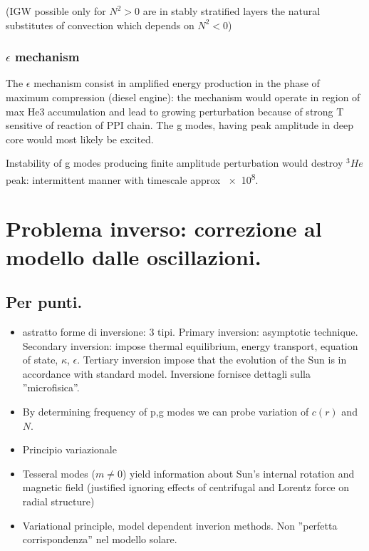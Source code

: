 \documentclass[oneside,12pt,fleqn]{memoir}
\begin{document}
{(IGW possible only for $N^2>0$ are in stably stratified layers the natural substitutes of convection which depends on $N^2<0$)

\subsection{$\epsilon$ mechanism}

The $\epsilon$ mechanism consist in amplified energy production in the phase of maximum compression (diesel engine): the mechanism would operate in region of max He3 accumulation and lead to growing perturbation because of strong T sensitive of  reaction of PPI chain. The g modes, having peak amplitude in deep core would most likely be excited.

Instability of g modes producing finite amplitude perturbation would destroy $^3He$ peak: intermittent manner with timescale approx \SI{e8}{\year}.


\chapter{Problema inverso: correzione al modello dalle oscillazioni.}
\PartialToc

\section{Per punti.}

\begin{itemize}
    
    \item astratto forme di inversione: 3 tipi. Primary inversion: asymptotic technique. Secondary inversion: impose thermal equilibrium, energy transport, equation of state, $\kappa$, $\epsilon$. Tertiary inversion impose that the evolution of the Sun is in accordance with standard model. Inversione fornisce dettagli sulla ''microfisica''.
    
    \item By determining frequency of p,g modes we can probe variation of $c(r)$ and $N$.
    \item Principio variazionale
    \item Tesseral modes ($m\neq0$) yield information about Sun's internal rotation and magnetic field (justified ignoring effects of centrifugal and Lorentz force on radial structure)
    \item Variational principle, model dependent inverion methods. Non ''perfetta corrispondenza'' nel modello solare.
    

\end{itemize}}
\end{document}
